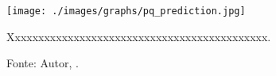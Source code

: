 \begin{figure}[H]
    \centering
    \texttt{[image: ./images/graphs/pq\_prediction.jpg]}
    \caption{Xxxxxxxxxxxxxxxxxxxxxxxxxxxxxxxxxxxxxxxxxxxx.}
    \label{fig:pq_prediction.jpg}
    \caption*{Fonte: Autor, \imprimirdata.}
\end{figure}




